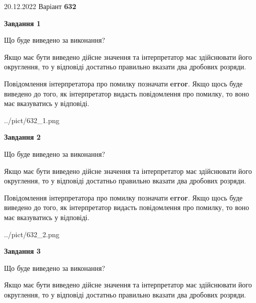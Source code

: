 \documentclass[12pt, ukrainian]{article}
\begin{document}
{20.12.2022 Варіант \No \textbf { 632 }\par}
{
\begin {Large}

{\begin {center}\textbf{Завдання 1}\end {center}}\par
Що буде виведено за виконання? \par

Якщо має бути виведено дійсне значення та інтерпретатор має здійснювати його округлення, 
то у відповіді достатньо правильно вказати два дробових розряди.

Повідомлення інтерпретатора про помилку позначати \textbf{error}.
Якщо щось буде виведено до того, як інтерпретатор видасть повідомлення про помилку, 
то воно має вказуватись у відповіді. \par

\begin{center}
	{../pict/632_1.png}
\end{center}
\newpage

{\begin {center}\textbf{Завдання 2}\end {center}}\par
Що буде виведено за виконання? \par

Якщо має бути виведено дійсне значення та інтерпретатор має здійснювати його округлення, 
то у відповіді достатньо правильно вказати два дробових розряди.

Повідомлення інтерпретатора про помилку позначати \textbf{error}.
Якщо щось буде виведено до того, як інтерпретатор видасть повідомлення про помилку, 
то воно має вказуватись у відповіді. \par

\begin{center}
	{../pict/632_2.png}
\end{center}
\newpage

{\begin {center}\textbf{Завдання 3}\end {center}}\par
Що буде виведено за виконання? \par

Якщо має бути виведено дійсне значення та інтерпретатор має здійснювати його округлення, 
то у відповіді достатньо правильно вказати два дробових розряди.


\end{Large}}
\end{document}

